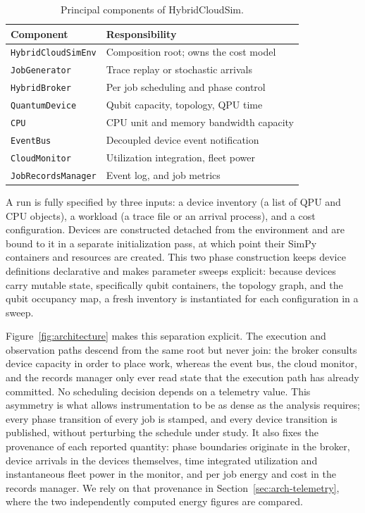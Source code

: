 \begin{table}[t]
\centering
\caption{Principal components of HybridCloudSim.}
\label{tab:components}
\small
\begin{tabular}{@{}ll@{}}
\toprule
\textbf{Component} & \textbf{Responsibility} \\
\midrule
\texttt{HybridCloudSimEnv} & Composition root; owns the cost model \\
\texttt{JobGenerator}      & Trace replay or stochastic arrivals \\
\texttt{HybridBroker}      & Per job scheduling and phase control \\
\texttt{QuantumDevice}     & Qubit capacity, topology, QPU time \\
\texttt{CPU}               & CPU unit and memory bandwidth capacity \\
\texttt{EventBus}          & Decoupled device event notification \\
\texttt{CloudMonitor}      & Utilization integration, fleet power \\
\texttt{JobRecordsManager} & Event log, and job metrics \\
\bottomrule
\end{tabular}
\end{table}

A run is fully specified by three inputs: a device inventory (a list of QPU and CPU objects), a workload (a trace file or an arrival process), and a cost configuration. Devices are constructed detached from the environment and are bound to it in a separate initialization pass, at which point their SimPy containers and resources are created. This two phase construction keeps device definitions declarative and makes parameter sweeps explicit: because devices carry mutable state, specifically qubit containers, the topology graph, and the qubit occupancy map, a fresh inventory is instantiated for each configuration in a sweep. 

Figure~\ref{fig:architecture} makes this separation explicit. The execution and observation paths descend from the same root but never join: the broker consults device capacity in order to place work, whereas the event bus, the cloud monitor, and the records manager only ever read state that the execution path has already committed. No scheduling decision depends on a telemetry value. This asymmetry is what allows instrumentation to be as dense as the analysis requires; every phase transition of every job is stamped, and every device transition is published, without perturbing the schedule under study. It also fixes the provenance of each reported quantity: phase boundaries originate in the broker, device arrivals in the devices themselves, time integrated utilization and instantaneous fleet power in the monitor, and per job energy and cost in the records manager. We rely on that provenance in Section~\ref{sec:arch-telemetry}, where the two independently computed energy figures are compared.

